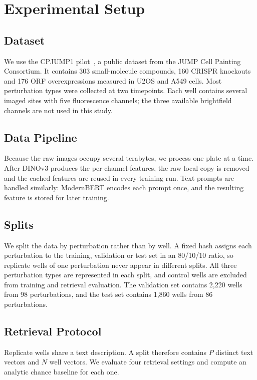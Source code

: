 \section{Experimental Setup}

\subsection{Dataset}

We use the CPJUMP1 pilot~\cite{chandrasekaran2024jump}, a public dataset from the JUMP Cell
Painting Consortium. It contains 303 small-molecule compounds, 160 CRISPR knockouts and 176 ORF
overexpressions measured in U2OS and A549 cells. Most perturbation types were collected at two
timepoints. Each well contains several imaged sites with five fluorescence channels; the three
available brightfield channels are not used in this study.

\subsection{Data Pipeline}

Because the raw images occupy several terabytes, we process one plate at a time. After DINOv3
produces the per-channel features, the raw local copy is removed and the cached features are reused
in every training run. Text prompts are handled similarly: ModernBERT encodes each prompt once, and
the resulting feature is stored for later training.

\subsection{Splits}

We split the data by perturbation rather than by well. A fixed hash assigns each perturbation to
the training, validation or test set in an 80/10/10 ratio, so replicate wells of one perturbation
never appear in different splits. All three perturbation types are represented in each split, and
control wells are excluded from training and retrieval evaluation. The validation set contains
2,220 wells from 98 perturbations, and the test set contains 1,860 wells from 86 perturbations.

\subsection{Retrieval Protocol}
\label{sec:protocol}

Replicate wells share a text description. A split therefore contains $P$ distinct text vectors and
$N$ well vectors. We evaluate four retrieval settings and compute an analytic chance baseline for
each one.

